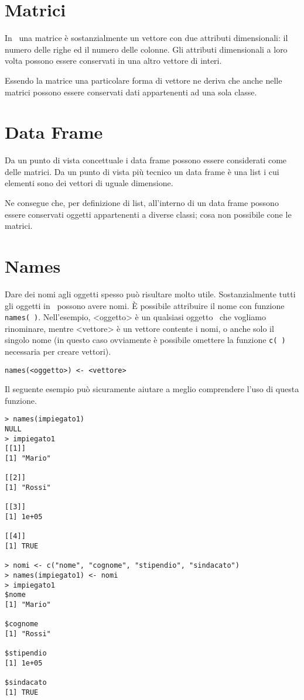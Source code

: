 \section{Matrici}

In \erre\ una matrice è sostanzialmente un vettore con due attributi dimensionali: il numero delle righe ed il numero delle colonne. Gli attributi dimensionali a loro volta possono essere conservati in una altro vettore di interi.

Essendo la matrice una particolare forma di vettore ne deriva che anche nelle matrici possono essere conservati dati appartenenti ad una sola classe.

\section{Data Frame}

Da un punto di vista concettuale i data frame possono essere considerati come delle matrici. Da un punto di vista più tecnico un data frame è una list i cui elementi sono dei vettori di uguale dimensione.

Ne consegue che, per definizione di list, all'interno di un data frame possono essere conservati oggetti appartenenti a diverse classi; cosa non possibile cone le matrici.

\section{Names}

Dare dei nomi agli oggetti spesso può risultare molto utile. Sostanzialmente tutti gli oggetti in \erre\ possono avere nomi. È possibile attribuire il nome con funzione \lstinline!names( )!. Nell'esempio, <oggetto> è un qualsiasi oggetto \erre\ che vogliamo rinominare, mentre <vettore> è un vettore contente i nomi, o anche solo il singolo nome (in questo caso ovviamente è possibile omettere la funzione \lstinline!c( )! necessaria per creare vettori).

\begin{lstlisting}
names(<oggetto>) <- <vettore>
\end{lstlisting}

Il seguente esempio può sicuramente aiutare a meglio comprendere l'uso di questa funzione.

\begin{lstlisting}
> names(impiegato1)
NULL
> impiegato1
[[1]]
[1] "Mario"

[[2]]
[1] "Rossi"

[[3]]
[1] 1e+05

[[4]]
[1] TRUE

> nomi <- c("nome", "cognome", "stipendio", "sindacato")
> names(impiegato1) <- nomi
> impiegato1
$nome
[1] "Mario"

$cognome
[1] "Rossi"

$stipendio
[1] 1e+05

$sindacato
[1] TRUE
\end{lstlisting}

